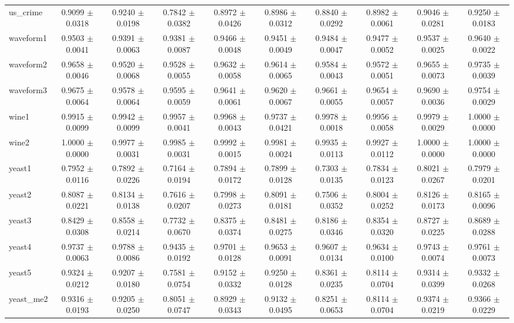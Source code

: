 \begin{table*}[htbp]
\begin{tabular}{lccccccccc}
            us\_crime & 0.9099 $\pm$ 0.0318 & 0.9240 $\pm$ 0.0198 & 0.7842 $\pm$ 0.0382 & 0.8972 $\pm$ 0.0426 & 0.8986 $\pm$ 0.0312 & 0.8840 $\pm$ 0.0292 & 0.8982 $\pm$ 0.0061 & 0.9046 $\pm$ 0.0281 & 0.9250 $\pm$ 0.0183 \\ 
            waveform1 & 0.9503 $\pm$ 0.0041 & 0.9391 $\pm$ 0.0063 & 0.9381 $\pm$ 0.0087 & 0.9466 $\pm$ 0.0048 & 0.9451 $\pm$ 0.0049 & 0.9484 $\pm$ 0.0047 & 0.9477 $\pm$ 0.0052 & 0.9537 $\pm$ 0.0025 & 0.9640 $\pm$ 0.0022 \\ 
            waveform2 & 0.9658 $\pm$ 0.0046 & 0.9520 $\pm$ 0.0068 & 0.9528 $\pm$ 0.0055 & 0.9632 $\pm$ 0.0058 & 0.9614 $\pm$ 0.0065 & 0.9584 $\pm$ 0.0043 & 0.9572 $\pm$ 0.0051 & 0.9655 $\pm$ 0.0073 & 0.9735 $\pm$ 0.0039 \\ 
            waveform3 & 0.9675 $\pm$ 0.0064 & 0.9578 $\pm$ 0.0064 & 0.9595 $\pm$ 0.0059 & 0.9641 $\pm$ 0.0061 & 0.9620 $\pm$ 0.0067 & 0.9661 $\pm$ 0.0055 & 0.9654 $\pm$ 0.0057 & 0.9690 $\pm$ 0.0036 & 0.9754 $\pm$ 0.0029 \\ 
            wine1 & 0.9915 $\pm$ 0.0099 & 0.9942 $\pm$ 0.0099 & 0.9957 $\pm$ 0.0041 & 0.9968 $\pm$ 0.0043 & 0.9737 $\pm$ 0.0421 & 0.9978 $\pm$ 0.0018 & 0.9956 $\pm$ 0.0058 & 0.9979 $\pm$ 0.0029 & 1.0000 $\pm$ 0.0000 \\ 
            wine2 & 1.0000 $\pm$ 0.0000 & 0.9977 $\pm$ 0.0031 & 0.9985 $\pm$ 0.0031 & 0.9992 $\pm$ 0.0015 & 0.9981 $\pm$ 0.0024 & 0.9935 $\pm$ 0.0113 & 0.9927 $\pm$ 0.0112 & 1.0000 $\pm$ 0.0000 & 1.0000 $\pm$ 0.0000 \\ 
            yeast1 & 0.7952 $\pm$ 0.0116 & 0.7892 $\pm$ 0.0226 & 0.7164 $\pm$ 0.0194 & 0.7894 $\pm$ 0.0172 & 0.7899 $\pm$ 0.0128 & 0.7303 $\pm$ 0.0135 & 0.7834 $\pm$ 0.0123 & 0.8021 $\pm$ 0.0267 & 0.7979 $\pm$ 0.0201 \\ 
            yeast2 & 0.8087 $\pm$ 0.0221 & 0.8134 $\pm$ 0.0138 & 0.7616 $\pm$ 0.0207 & 0.7998 $\pm$ 0.0273 & 0.8091 $\pm$ 0.0181 & 0.7506 $\pm$ 0.0352 & 0.8004 $\pm$ 0.0252 & 0.8126 $\pm$ 0.0173 & 0.8165 $\pm$ 0.0096 \\ 
            yeast3 & 0.8429 $\pm$ 0.0308 & 0.8558 $\pm$ 0.0214 & 0.7732 $\pm$ 0.0670 & 0.8375 $\pm$ 0.0374 & 0.8481 $\pm$ 0.0275 & 0.8186 $\pm$ 0.0346 & 0.8354 $\pm$ 0.0320 & 0.8727 $\pm$ 0.0225 & 0.8689 $\pm$ 0.0288 \\ 
            yeast4 & 0.9737 $\pm$ 0.0063 & 0.9788 $\pm$ 0.0086 & 0.9435 $\pm$ 0.0192 & 0.9701 $\pm$ 0.0128 & 0.9653 $\pm$ 0.0091 & 0.9607 $\pm$ 0.0134 & 0.9634 $\pm$ 0.0100 & 0.9743 $\pm$ 0.0074 & 0.9761 $\pm$ 0.0073 \\ 
            yeast5 & 0.9324 $\pm$ 0.0212 & 0.9207 $\pm$ 0.0180 & 0.7581 $\pm$ 0.0754 & 0.9152 $\pm$ 0.0332 & 0.9250 $\pm$ 0.0128 & 0.8361 $\pm$ 0.0235 & 0.8114 $\pm$ 0.0704 & 0.9314 $\pm$ 0.0399 & 0.9332 $\pm$ 0.0268 \\ 
            yeast\_me2 & 0.9316 $\pm$ 0.0193 & 0.9205 $\pm$ 0.0250 & 0.8051 $\pm$ 0.0747 & 0.8929 $\pm$ 0.0343 & 0.9132 $\pm$ 0.0495 & 0.8251 $\pm$ 0.0653 & 0.8114 $\pm$ 0.0704 & 0.9374 $\pm$ 0.0219 & 0.9366 $\pm$ 0.0229 \\ 
        \bottomrule
    \end{tabular}
\end{table*}
